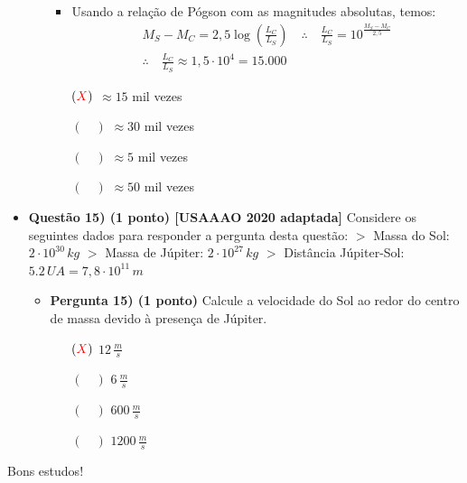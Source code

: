 \documentclass[a4paper, 12pt]{article}
\newcommand{\red}[1]{\textcolor{red}{#1}}
\begin{document}
\begin{flushleft}
\begin{itemize}
\begin{itemize}
{\begin{itemize}
                            \item Usando a relação de Pógson com as magnitudes absolutas, temos:
                                \begin{equation*} \begin{gathered}
                                    M_S-M_C = 2,5 \log \left(\frac{L_C}{L_S}\right) \quad \therefore \quad \frac{L_C}{L_S} = 10^{\frac{M_S-M_C}{2,5}} \\
                                    \therefore \quad \frac{L_C}{L_S} \approx 1,5 \cdot 10^4 = 15.000
                                \end{gathered} \end{equation*}
                        \end{itemize}}
                        \begin{itemize}
                            \item[$(\red{X})$] $\approx 15$ mil vezes
                            \item[$(\quad)$] $\approx 30$ mil vezes
                            \item[$(\quad)$] $\approx 5$ mil vezes
                            \item[$(\quad)$] $\approx 50$ mil vezes
                        \end{itemize}
                \end{itemize}
            
            \item \textbf{Questão 15) (1 ponto) [USAAAO 2020 adaptada]} Considere os seguintes dados para responder a pergunta desta questão: \linebreak\linebreak $>$ Massa do Sol: $2 \cdot 10^{30} \, kg$ \linebreak $>$ Massa de Júpiter: $2 \cdot 10^{27} \, kg$ \linebreak $>$ Distância Júpiter-Sol: $5.2 \, UA = 7,8 \cdot 10^{11} \, m$
                \begin{itemize}
                    \item \textbf{Pergunta 15) (1 ponto)} Calcule a velocidade do Sol ao redor do centro de massa devido à presença de Júpiter.
                        \begin{itemize}
                            \item[$(\red{X})$] $12 \, \frac{m}{s}$
                            \item[$(\quad)$] $6 \, \frac{m}{s}$
                            \item[$(\quad)$] $600 \, \frac{m}{s}$
                            \item[$(\quad)$] $1200 \, \frac{m}{s}$
                        \end{itemize}
                \end{itemize}
        \end{itemize} \end{flushleft}

    \begin{flushright}
		\begin{large}
			Bons estudos!
		\end{large}
	\end{flushright}
\end{document}
